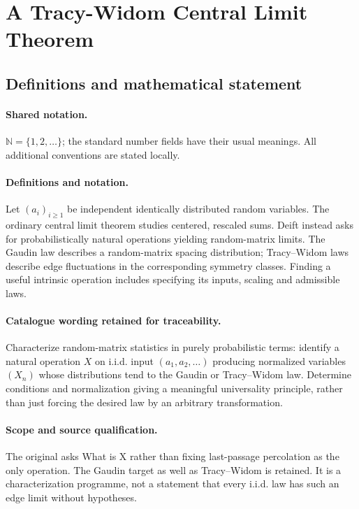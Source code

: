 \documentclass[11pt]{article}
\begin{document}
\section{A Tracy-Widom Central Limit Theorem}\label{statement}

\subsection{Definitions and mathematical statement}

\paragraph{Shared notation.}$\mathbb N=\{1,2,\ldots\}$; the standard number fields have their usual meanings. All additional conventions are stated locally.


\paragraph{Definitions and notation.}Let $(a_i)_{i\ge1}$ be independent identically distributed random variables. The ordinary central limit theorem studies centered, rescaled sums. Deift instead asks for probabilistically natural operations yielding random-matrix limits. The Gaudin law describes a random-matrix spacing distribution; Tracy--Widom laws describe edge fluctuations in the corresponding symmetry classes. Finding a useful intrinsic operation includes specifying its inputs, scaling and admissible laws.

\paragraph{Catalogue wording retained for traceability.}
Characterize random-matrix statistics in purely probabilistic terms: identify a natural operation $X$ on i.i.d. input $(a_1,a_2,\ldots)$ producing normalized variables $(X_n)$ whose distributions tend to the Gaudin or Tracy--Widom law. Determine conditions and normalization giving a meaningful universality principle, rather than just forcing the desired law by an arbitrary transformation.
\paragraph{Scope and source qualification.}The original asks What is X rather than fixing last-passage percolation as the only operation. The Gaudin target as well as Tracy–Widom is retained. It is a characterization programme, not a statement that every i.i.d. law has such an edge limit without hypotheses.
\end{document}

